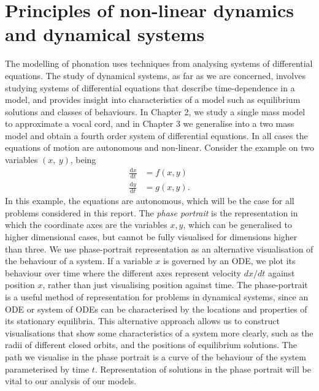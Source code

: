 \documentclass{report}
\begin{document}

\section{Principles of non-linear dynamics and dynamical systems}

The modelling of phonation uses techniques from analysing systems of differential equations.
The study of dynamical systems, as far as we are concerned,
involves studying systems of differential equations that describe time-dependence in a model,
and provides insight into characteristics of a model such as equilibrium solutions and classes of behaviours.
In Chapter 2, we study a single mass model to approximate a vocal cord,
and in Chapter 3 we generalise into a two mass model and obtain a fourth order system of differential equations.
In all cases the equations of motion are autonomous and non-linear.
Consider the example on two variables \((x,~y)\), being
\begin{equation}
    \begin{aligned}
        \frac{\mathrm{d}x}{\mathrm{d}t} &= f(x,y) \\
        \frac{\mathrm{d}y}{\mathrm{d}t} &= g(x,y).
    \end{aligned}
\end{equation}
In this example,
the equations are autonomous,
which will be the case for all problems considered in this report.
The \textit{phase portrait} is the representation in which the coordinate axes are the variables $x,y$,
which can be generalised to higher dimensional cases,
but cannot be fully visualised for dimensions higher than three.
We use phase-portrait representation as an alternative visualisation of the behaviour of a system.
If a variable $x$ is governed by an ODE,
we plot its behaviour over time where the different axes represent velocity $dx/dt$ against position $x$,
rather than just visualising position against time.
The phase-portrait is a useful method of representation for problems in dynamical systems,
since an ODE or system of ODEs can be characterised by the locations and properties of its stationary equilibria.
This alternative approach allows us to construct visualisations that show some characteristics of a system more clearly, such as the radii of different closed orbits,
and the positions of equilibrium solutions.
The path we visualise in the phase portrait is a curve of the behaviour of the system parameterised by time $t$. 
Representation of solutions in the phase portrait will be vital to our analysis of our models.
\end{document}
